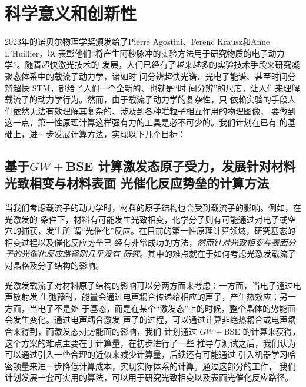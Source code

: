 


\section{科学意义和创新性}

2023年的诺贝尔物理学奖颁发给了Pierre Agostini、Ferenc Krausz和Anne L'Huillier，以
表彰他们``将产生阿秒脉冲的实验方法用于研究物质的电子动力学''。随着超快激光技术的
发展，人们已经有了越来越多的实验技术手段来研究凝聚态体系中的载流子动力学，诸如时
间分辨超快光谱、光电子能谱、甚至时间分辨超快 STM，都给了人们一个全新的、也就是“时
间分辨”的尺度，让人们来理解载流子的动力学行为。然而，由于载流子动力学的复杂性，只
依赖实验的手段人们依然无法有效理解其复杂的、涉及到各种准粒子相互作用的物理图像，
要做到这一点，第一性原理计算这样强有力的工具是必不可少的。我们计划在\hnamd{}已有
的基础上，进一步发展计算方法，实现以下几个目标：

\subsection{基于$GW{}+{}$BSE 计算激发态原子受力，发展针对材料光致相变与材料表面
  光催化反应势垒的计算方法}


当我们考虑载流子的动力学时，材料的原子结构也会受到载流子的影响。例如，在光激发的
条件下，材料有可能发生光致相变，化学分子则有可能通过对电子或空穴的捕获，发生所
谓“光催化”反应。在目前的第一性原理计算领域，研究基态的相变过程以及催化反应势垒已
经有非常成功的方法，\emph{然而针对光致相变与表面分子的光催化反应路径则几乎没有
  研究}。其中的难点就在于如何考虑光激发载流子对晶格及分子结构的影响。

光激发载流子对材料原子结构的影响可以分两方面来考虑：一方面，当电子通过电声散射发
生弛豫时，能量会通过电声耦合传递给相应的声子，产生热效应；另一方面，当电子不是处
于基态，而是在某个“激发态”上的时候，整个晶体的势能面会发生变化。通过电声耦合激发
声子的过程，可以通过计算非绝热耦合或电声耦合来得到，而激发态对势能面的影响，我们
计划通过 $GW+{}$BSE 的计算来获得，这个方案的难点主要在于计算量，在初步进行了一些
推导与测试之后，我们认为可以通过引入一些合理的近似来减少计算量，后续还有可能通过
引入机器学习哈密顿量来进一步降低计算成本，实现实际体系的计算。通过这部分的工作，
我们计划发展一套可实用的算法，可以用于研究光致相变以及表面光催化反应路径。

